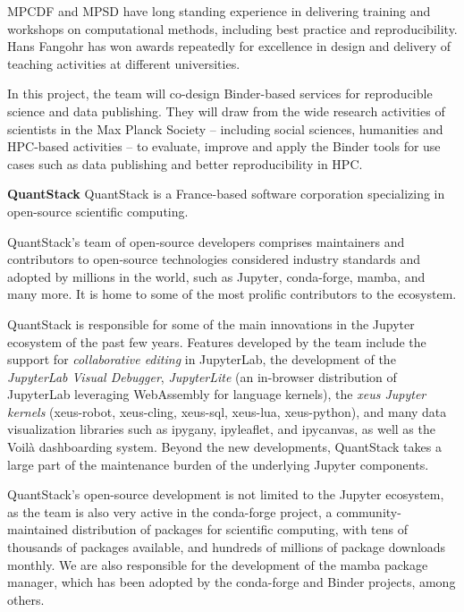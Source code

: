 MPCDF and MPSD have long standing experience in delivering training and
workshops on computational methods, including best practice and reproducibility.
Hans Fangohr has won awards repeatedly for excellence in design and delivery of
teaching activities at different universities.

In this project, the team will co-design Binder-based services for
reproducible science and data publishing. They will draw from the wide research
activities of scientists in the Max Planck Society -- including social sciences,
humanities and HPC-based activities -- to evaluate, improve and apply the Binder
tools for use cases such as data publishing and better reproducibility in HPC.

\noindent \textbf{QuantStack}
QuantStack is a France-based software corporation specializing in open-source
scientific computing.

QuantStack's team of open-source developers comprises maintainers and contributors
to open-source technologies considered industry standards and adopted by millions
in the world, such as Jupyter, conda-forge, mamba, and many more. It is home to
some of the most prolific contributors to the ecosystem.

QuantStack is responsible for some of the main innovations in the Jupyter ecosystem
of the past few years. Features developed by the team include the support for
\emph{collaborative editing} in JupyterLab, the development of the \emph{JupyterLab Visual Debugger},
\emph{JupyterLite} (an in-browser distribution of JupyterLab leveraging WebAssembly for language kernels),
the \emph{xeus Jupyter kernels} (xeus-robot, xeus-cling, xeus-sql, xeus-lua, xeus-python),
and many data visualization libraries such as ipygany, ipyleaflet, and ipycanvas,
as well as the Voilà dashboarding system. Beyond the new developments, QuantStack takes
a large part of the maintenance burden of the underlying Jupyter components.

QuantStack's open-source development is not limited to the Jupyter ecosystem, as the team
is also very active in the conda-forge project, a community-maintained distribution
of packages for scientific computing, with tens of thousands of packages available,
and hundreds of millions of package downloads monthly. We are also responsible for
the development of the mamba package manager, which has been adopted by the conda-forge
and Binder projects, among others.

